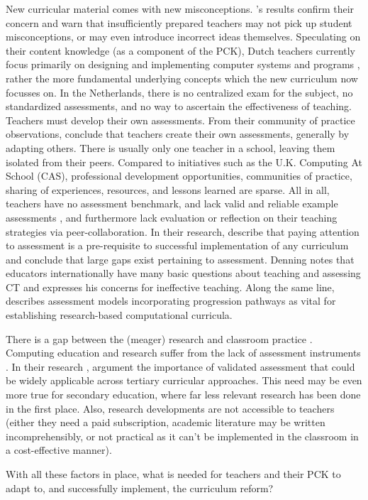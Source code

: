 New curricular material comes with new misconceptions. \citeauthor{duncan2017teachers}'s results confirm their concern and warn that insufficiently prepared teachers may not pick up student misconceptions, or may even introduce incorrect ideas themselves. Speculating on their content knowledge (as a component of the PCK), Dutch teachers currently focus primarily on designing and implementing computer systems and programs \cite{Schmidt2007}, rather the more fundamental underlying concepts which the new curriculum now focusses on. In the Netherlands, there is no centralized exam for the subject, no standardized assessments, and no way to ascertain the effectiveness of teaching. Teachers must develop their own assessments. From their community of practice observations,  conclude that teachers create their own assessments, generally by adapting others. There is usually only one teacher in a school, leaving them isolated from their peers. Compared to initiatives such as the U.K. Computing At School (CAS), professional development opportunities, communities of practice, sharing of experiences, resources, and lessons learned are sparse. All in all, teachers have no assessment benchmark, and lack valid and reliable example assessments \cite{Yadav2015}, and furthermore lack evaluation or reflection on their teaching strategies via peer-collaboration. In their research,  describe that paying attention to assessment is a pre-requisite to successful implementation of any curriculum and conclude that large gaps exist pertaining to assessment. Denning \cite{denning2017remaining} notes that educators internationally have many basic questions about teaching and assessing CT and expresses his concerns for ineffective teaching. Along the same line,  describes assessment models incorporating progression pathways as vital for establishing research-based computational curricula.


There is a gap between the (meager) research and classroom practice \cite{Yadav2015}.  Computing education and research suffer from the lack of assessment instruments \cite{voogt2017effecten}. In their research , argument the importance of validated assessment that could be widely applicable across tertiary curricular approaches. This need may be even more true for secondary education, where far less relevant research has been done in the first place. Also, research developments are not accessible to teachers (either they need a paid subscription, academic literature may be written incomprehensibly, or not practical as it can't be implemented in the classroom in a cost-effective manner).

With all these factors in place, what is needed for teachers and their PCK to adapt to, and successfully implement, the curriculum reform?
